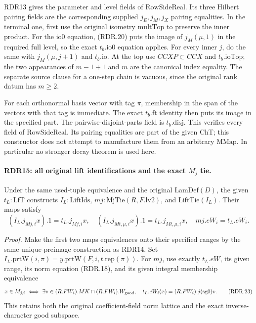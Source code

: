 RDR13 gives the parameter and level fields of
\(\mathrm{RowSideReal}\).  Its three Hilbert pairing fields
are the corresponding supplied \(j_E,j_M,j_X\) pairing
equalities.  In the terminal one, first use the original
isometry \(\mathrm{multTop}\) to preserve the inner product.
For the \(\mathrm{io0}\) equation, (RDR.20) puts the image
of \(j_M(\mu,1)\) in the required full level, so the exact
\(t_b.\mathrm{io0}\) equation applies.  For every inner
\(j\), do the same with \(j_M(\mu,j+1)\) and
\(t_b.\mathrm{io}\).  At the top use \(CCXP\subset CCX\)
and \(t_b.\mathrm{ioTop}\); the two appearances of
\(m-1+1\) and \(m\) are the canonical index equality.
The separate source clause for a one-step chain is vacuous,
since the original rank datum has \(m\ge2\).

For each orthonormal basis vector with tag \(\pi\), membership
in the span of the vectors with that tag is immediate.
The exact \(t_b.\mathrm{ft}\) identity then puts its image
in the specified part.  The pairwise-disjoint-parts field is
\(t_b.\mathrm{disj}\).  This verifies every field of
\(\mathrm{RowSideReal}\).  Its pairing equalities are part of
the given \(\mathrm{ChT}\); this constructor does not attempt
to manufacture them from an arbitrary \(\mathrm{MMap}\).
In particular no stronger decay theorem is used here.

\paragraph{RDR15: all original lift identifications and the exact \(M_j\) tie.}
\label{claim:RDR15}
Under the same used-tuple equivalence and the original
\(\mathrm{LamDef}(D)\), the given \(t_L:\mathrm{LfT}\)
constructs \(I_L:\mathrm{LiftIds}\),
\(mj:\mathrm{MjTie}(R,F.\mathrm{lv2})\), and
\(\mathrm{LiftTie}(I_L)\).  Their maps satisfy
\[
 (I_L.j_{Mj,i}x).1=t_L.j_{Mj,i}x,\quad
 (I_L.j_{Mt,\mu,i}x).1=t_L.j_{Mt,\mu,i}x,\quad
 mj.eW_i=t_L.eW_i.                                          \tag{RDR.22}
\]

\emph{Proof.}
Make the first two maps equivalences onto their specified
ranges by the same unique-preimage construction as RDR14.
Set \(I_L.\mathrm{prtW}(i,\pi)=y.\mathrm{prtW}
(F,i,t.\mathrm{rep}(\pi))\).  For \(mj\), use exactly
\(t_L.eW\), its given range, its norm equation (RDR.18),
and its given integral membership equivalence
\[
 x\in M_{j,i}\ \Longleftrightarrow\
 \exists v\in (R.FW_i).MK\cap (R.FW_i).W_{\rm good},
                \quad t_L.eW_i(x)=(R.FW_i).j(\mathrm{sg0})v.
                                                               \tag{RDR.23}
\]
This retains both the original coefficient-field norm lattice
and the exact inverse-character good subspace.

